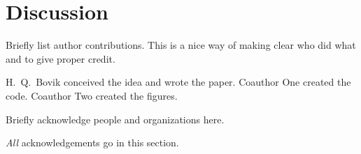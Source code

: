 \documentclass{uai2023} %
\begin{document}
\section{Discussion}



\begin{contributions} %
    Briefly list author contributions.
    This is a nice way of making clear who did what and to give proper credit.

    H.~Q.~Bovik conceived the idea and wrote the paper.
    Coauthor One created the code.
    Coauthor Two created the figures.
\end{contributions}

\begin{acknowledgements} %
    Briefly acknowledge people and organizations here.

    \emph{All} acknowledgements go in this section.
\end{acknowledgements}

\ifbiblatex
    \printbibliography
\else
    
\fi

\appendix
\onecolumn

\end{document}
